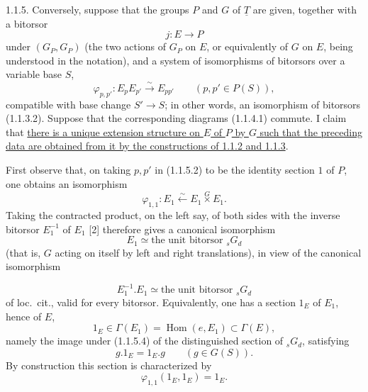 
1.1.5. Conversely, suppose that the groups $P$ and $G$ of
$\underline T$ are given, together with a bitorsor
\begin{equation}\tag{1.1.5.1}
 j:E\longrightarrow P
\end{equation}
under $(G_P,G_P)$ (the two actions of $G_P$ on $E$, or equivalently of
$G$ on $E$, being understood in the notation), and a system of
isomorphisms of bitorsors over a variable base $S$,
\begin{equation}\tag{1.1.5.2}
 \varphi_{p,p'}:E_pE_{p'}\overset{\sim}{\longrightarrow}E_{pp'}
 \qquad (p,p'\in P(S)),
\end{equation}
compatible with base change $S'\longrightarrow S$; in other words, an
isomorphism of bitorsors (1.1.3.2). Suppose that the corresponding
diagrams (1.1.4.1) commute. I claim that \underline{there is a unique
extension structure on $E$ of $P$ by $G$ such that the preceding data
are obtained from it by the constructions of 1.1.2 and 1.1.3}.

First observe that, on taking $p,p'$ in (1.1.5.2) to be the identity
section $1$ of $P$, one obtains an isomorphism
\begin{equation}\tag{1.1.5.3}
 \varphi_{1,1}:E_1\overset{\sim}{\longleftarrow}
 E_1\mathbin{\overset{G}{\times}}E_1.
\end{equation}
Taking the contracted product, on the left say, of both sides with the
inverse bitorsor $E_1^{-1}$ of $E_1$ [2] therefore gives a canonical
isomorphism
\begin{equation}\tag{1.1.5.4}
 E_1\simeq\text{the unit bitorsor }{}_sG_d
\end{equation}
(that is, $G$ acting on itself by left and right translations), in view
of the canonical isomorphism


\[
 E_1^{-1}.E_1\simeq\text{the unit bitorsor }{}_sG_d
\]
of loc.~cit., valid for every bitorsor. Equivalently, one has a section
$1_E$ of $E_1$, hence of $E$,
\begin{equation}\tag{1.1.5.5}
 1_E\in\Gamma(E_1)=\operatorname{Hom}(e,E_1)\subset\Gamma(E),
\end{equation}
namely the image under (1.1.5.4) of the distinguished section of
${}_sG_d$, satisfying
\[
 g.1_E=1_E.g\qquad(g\in G(S)).
\]
By construction this section is characterized by
\begin{equation}\tag{1.1.5.6}
 \varphi_{1,1}(1_E,1_E)=1_E.
\end{equation}

